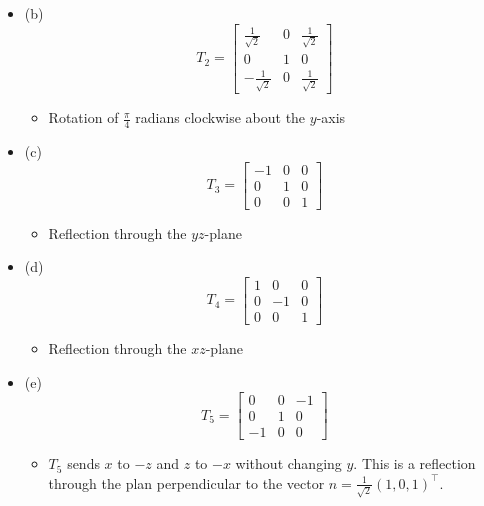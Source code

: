 \documentclass{article}
\begin{document}
\begin{itemize}
\begin{itemize}
\begin{itemize}
        \end{itemize}
        \item (b)
        \[
        T_2 = \left[ \begin{array}{ccc}
            \frac{1}{\sqrt{2}} & 0 & \frac{1}{\sqrt{2}} \\
            0 & 1 & 0 \\
            -\frac{1}{\sqrt{2}} & 0 & \frac{1}{\sqrt{2}}
        \end{array} \right]
        \]
        \begin{itemize}
            \item Rotation of $\frac{\pi}{4}$ radians clockwise about the $y$-axis
        \end{itemize}
        \item (c)
        \[
        T_3 = \left[ \begin{array}{ccc}
            -1 & 0 & 0 \\
            0 & 1 & 0 \\
            0 & 0 & 1
        \end{array} \right]
        \]
        \begin{itemize}
            \item Reflection through the $yz$-plane
        \end{itemize}
        \item (d)
        \[
        T_4 = \left[ \begin{array}{ccc}
            1 & 0 & 0 \\
            0 & -1 & 0 \\
            0 & 0 & 1
        \end{array} \right]
        \]
        \begin{itemize}
            \item Reflection through the $xz$-plane
        \end{itemize}
        \item (e)
        \[
        T_5 = \left[ \begin{array}{ccc}
            0 & 0 & -1 \\
            0 & 1 & 0 \\
            -1 & 0 & 0
        \end{array} \right]
        \]
        \begin{itemize}
            \item $T_5$ sends $x$ to $-z$ and $z$ to $-x$ without changing $y$. This is a reflection through the plan perpendicular to the vector $\hat{n} = \frac{1}{\sqrt{2}}(1,0,1)^\top$.
        \end{itemize}
    \end{itemize}
\end{itemize}
\end{document}
